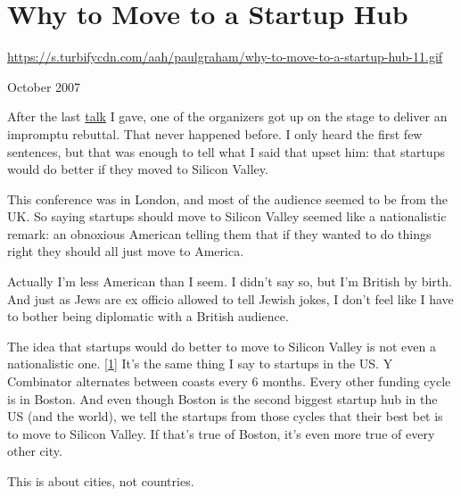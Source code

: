 \chapter{Why to Move to a Startup Hub}


            
              
                \href{https://s.turbifycdn.com/aah/paulgraham/why-to-move-to-a-startup-hub-11.gif}{https://s.turbifycdn.com/aah/paulgraham/why-to-move-to-a-startup-hub-11.gif}



October 2007

After the last
                  \href{http://www.paulgraham.com/webstartups.html}{talk} I gave, one of the
                  organizers got up on the stage to deliver an impromptu
                  rebuttal. That never happened before. I only heard the first
                  few sentences, but that was enough to tell what I said that
                  upset him: that startups would do better if they moved to
                  Silicon Valley.

This conference was in London, and
                  most of the audience seemed to be from the UK. So saying
                  startups should move to Silicon Valley seemed like a
                  nationalistic remark: an obnoxious American telling them that
                  if they wanted to do things right they should all just move to
                  America.

Actually I'm less American than I seem. I
                  didn't say so, but I'm British by birth. And just as Jews are
                  ex officio allowed to tell Jewish jokes, I don't feel like I
                  have to bother being diplomatic with a British audience.

The
                  idea that startups would do better to move to Silicon Valley
                  is not even a nationalistic one.
                  [\href{\#f1n}{1}]
                  It's the same thing I say to startups in the US. Y Combinator
                  alternates between coasts every 6 months. Every other funding
                  cycle is in Boston. And even though Boston is the second
                  biggest startup hub in the US (and the world), we tell the
                  startups from those cycles that their best bet is to move to
                  Silicon Valley. If that's true of Boston, it's even more true
                  of every other city.

This is about cities, not
                  countries.

